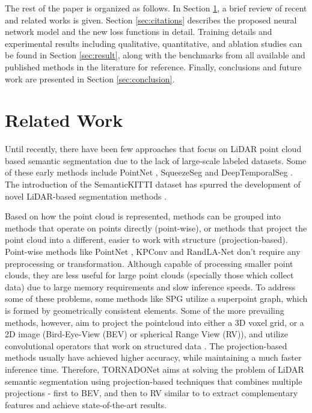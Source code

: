 \documentclass{article}
\begin{document}
The rest of the paper is organized as follows. In Section \ref{sec:relwork}, a brief review of recent and related works is given. Section \ref{sec:citations} describes the proposed neural network model and the new loss functions in detail. Training details and experimental results including qualitative, quantitative, and ablation studies can be found in Section \ref{sec:result}, along with the benchmarks from all available and published methods in the literature for reference. Finally, conclusions and future work are presented in Section \ref{sec:conclusion}.
\section{Related Work}
\label{sec:relwork}



Until recently, there have been few approaches that focus on LiDAR point cloud based semantic segmentation due to the lack of large-scale labeled datasets. Some of these early methods include  PointNet \cite{qi2017pointnet}, SqueezeSeg \cite{wu2018squeezeseg} and DeepTemporalSeg \cite{dewan2019deeptemporalseg}.
The introduction of the SemanticKITTI dataset \cite{DBLP:conf/iccv/BehleyGMQBSG19} has spurred the development of novel LiDAR-based segmentation methods \cite{thomas2019kpconv, landrieu2018large, wu2019squeezesegv2, dewan2019deeptemporalseg, aksoy2019salsanet, rosu2019latticenet, milioto2019rangenet++, cortinhal2020salsanext, zhang2020polarnet, alonso20203d}. 

Based on how the point cloud is represented, methods can be grouped into methods that operate on points directly (point-wise), or methods that project the point cloud into a different, easier to work with structure (projection-based).
Point-wise methods like PointNet \cite{qi2017pointnet}, KPConv \cite{thomas2019kpconv} and RandLA-Net \cite{hu2019randla} don't require any preprocessing or transformation. Although capable of processing smaller point clouds, they are less useful for large point clouds (specially those which collect   data) due to large memory requirements and slow inference speeds. To address some of these problems, some methods like SPG \cite{landrieu2018large} utilize a superpoint graph, which is formed by geometrically consistent elements. Some of the more prevailing methods, however, aim to project the pointcloud into either a 3D voxel grid, or a 2D image (Bird-Eye-View (BEV) or spherical Range View (RV)), and utilize convolutional operators that work on structured data \cite{wu2018squeezeseg, wu2019squeezesegv2, dewan2019deeptemporalseg, aksoy2019salsanet, rosu2019latticenet, milioto2019rangenet++, cortinhal2020salsanext, zhou2019endtoend}. The projection-based methods usually have achieved higher accuracy, while maintaining a much faster inference time. Therefore, TORNADONet aims at solving the problem of LiDAR semantic segmentation  using projection-based techniques that combines multiple projections -  first to BEV, and then to RV similar to \cite{zhou2019endtoend} to extract complementary features and achieve state-of-the-art results. 
\end{document}
